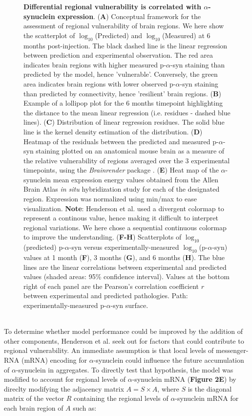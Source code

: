 \begin{figure}[!h]
    \caption{
      \textbf{Differential regional vulnerability is correlated with $\alpha$-synuclein expression}.
        (\textbf{A}) Conceptual framework for the assessment of regional vulnerability of brain regions. We here show the scatterplot of $\log_{10}$(Predicted) and  $\log_{10}$(Measured) at 6 months post-injection. The black dashed line is the linear regression between prediction and experimental observation. The red area indicates brain regions with higher measured p-$\alpha$-syn staining than predicted by the model, hence 'vulnerable'. Conversely, the green area indicates brain regions with lower observed p-$\alpha$-syn staining than predicted by connectivity, hence 'resilient' brain regions.
        (\textbf{B}) Example of a lollipop plot for the 6 months timepoint highlighting the distance to the mean linear regression (i.e. residues - dashed blue lines).
        (\textbf{C}) Distribution of linear regression residues. The solid blue line is the kernel density estimation of the distribution. 
        (\textbf{D}) Heatmap of the residuals between the predicted and measured p-$\alpha$-syn staining plotted on an anatomical mouse brain as a measure of the relative vulnerability of regions averaged over the 3 experimental timepoints, using the  \textit{Brainrender} package \cite{Claudi_2021}.
        (\textbf{E}) Heat map of the $\alpha$-synuclein mean expression energy values obtained from the Allen Brain Atlas \textit{in situ} hybridization study for each of the designated region. Expression was normalized using min/max to ease visualization. \textbf{Note}: Henderson et al. used a divergent colormap to represent a continous value, hence making it difficult to interpret regional variations. We here chose a sequential continuous colormap to improve the understanding.
        (\textbf{F-H}) Scatterplots of $\log_{10}$(predicted) p-$\alpha$-syn versus experimentally-measured $\log_{10}$(p-$\alpha$-syn) values at 1 month (\textbf{F}), 3 months (\textbf{G}), and 6 months (\textbf{H}). The blue lines are the linear correlations between experimental and predicted values (shaded areas: 95\% confidence interval). Values at the bottom right of each panel are the Pearson's correlation coefficient $r$ between experimental and predicted pathologies. Path: experimentally-measured p-$\alpha$-syn surface.}

\end{figure}

\\
To determine whether model performance could be improved by the addition of other components, Henderson et al. seek out for factors that could contribute to regional vulnerability. An immediate assumption is that local levels of messenger-RNA (mRNA) encoding for $\alpha$-synuclein could influence the future accumulation of $\alpha$-synuclein in aggregates. To directly test that hypothesis, the model was modified to account for regional levels of $\alpha$-synuclein mRNA (\textbf{Figure 2E}) by direclty modifying the adjacency matrix $A = S \times A$, where $S$ is the diagonal matrix of the vector $R$ containing the regional levels of $\alpha$-synuclein mRNA for each brain region of $A$ such as: 

